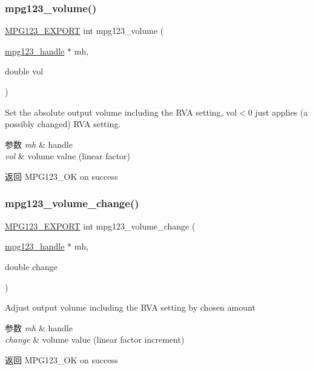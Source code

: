 \subsubsection{\texorpdfstring{mpg123\+\_\+volume()}{mpg123\_volume()}}
{\footnotesize\ttfamily \hyperlink{mpg123_8h_a2ba98cfba3f760879df70e755b2a61cc}{M\+P\+G123\+\_\+\+E\+X\+P\+O\+RT} int mpg123\+\_\+volume (\begin{DoxyParamCaption}\item[{\hyperlink{group__mpg123__init_ga6728e2839a395f3a07d4514da659faca}{mpg123\+\_\+handle} $\ast$}]{mh,  }\item[{double}]{vol }\end{DoxyParamCaption})}

Set the absolute output volume including the R\+VA setting, vol$<$0 just applies (a possibly changed) R\+VA setting. 
\begin{DoxyParams}{参数}
{\em mh} & handle \\
\hline
{\em vol} & volume value (linear factor) \\
\hline
\end{DoxyParams}
\begin{DoxyReturn}{返回}
M\+P\+G123\+\_\+\+OK on success 
\end{DoxyReturn}
\mbox{\label{group__mpg123__voleq_gaa0897be03a78daf11e28c0e7263a0ae1}} 
\subsubsection{\texorpdfstring{mpg123\+\_\+volume\+\_\+change()}{mpg123\_volume\_change()}}
{\footnotesize\ttfamily \hyperlink{mpg123_8h_a2ba98cfba3f760879df70e755b2a61cc}{M\+P\+G123\+\_\+\+E\+X\+P\+O\+RT} int mpg123\+\_\+volume\+\_\+change (\begin{DoxyParamCaption}\item[{\hyperlink{group__mpg123__init_ga6728e2839a395f3a07d4514da659faca}{mpg123\+\_\+handle} $\ast$}]{mh,  }\item[{double}]{change }\end{DoxyParamCaption})}

Adjust output volume including the R\+VA setting by chosen amount 
\begin{DoxyParams}{参数}
{\em mh} & handle \\
\hline
{\em change} & volume value (linear factor increment) \\
\hline
\end{DoxyParams}
\begin{DoxyReturn}{返回}
M\+P\+G123\+\_\+\+OK on success 
\end{DoxyReturn}
